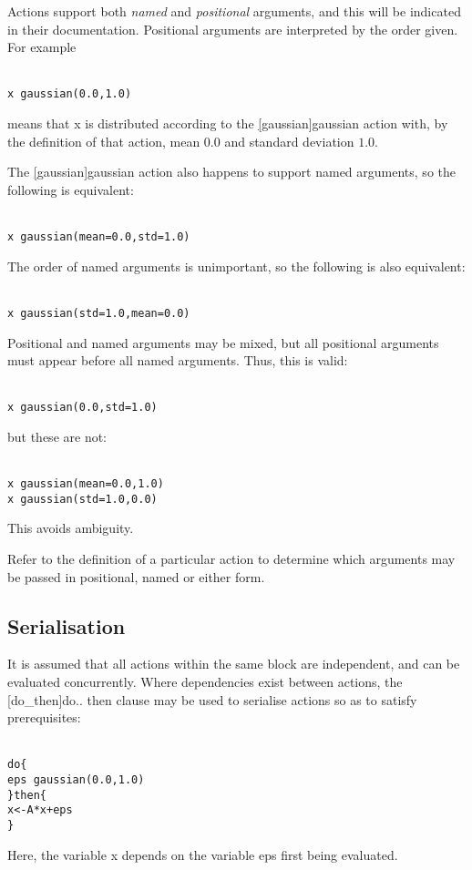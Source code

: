 Actions support both \emph{named} and \emph{positional}
arguments, and this will be indicated in their
documentation. Positional arguments are interpreted by the order given. For
example
\begin{alltt}{\sf
    x ~ gaussian(0.0, 1.0)
}\end{alltt}
means that \textsf{x} is distributed according to the
\hyperref[hyper][gaussian]{\sf gaussian} action with, by the
definition of that action, mean $0.0$ and standard deviation $1.0$.

The \hyperref[hyper][gaussian]{\sf gaussian} action also
happens to support named arguments, so the following is equivalent:
\begin{alltt}{\sf
    x ~ gaussian(mean = 0.0, std = 1.0)
}\end{alltt}
The order of named arguments is unimportant, so the following is also
equivalent:
\begin{alltt}{\sf
    x ~ gaussian(std = 1.0, mean = 0.0)
}\end{alltt}

Positional and named arguments may be mixed, but all positional arguments must
appear before all named arguments. Thus, this is valid:
\begin{alltt}{\sf
    x ~ gaussian(0.0, std = 1.0)
}\end{alltt}
but these are not:
\begin{alltt}{\sf
    x ~ gaussian(mean = 0.0, 1.0)
    x ~ gaussian(std = 1.0, 0.0)
}\end{alltt}
This avoids ambiguity.

Refer to the definition of a particular action to determine which arguments
may be passed in positional, named or either form.

\subsection{Serialisation\label{Serialisation}}

It is assumed that all actions within the same block are independent, and can
be evaluated concurrently. Where dependencies exist between actions, the
\hyperref[hyper][do_then]{\sf do.. then} clause may be used to
serialise actions so as to satisfy prerequisites:
\begin{alltt}{\sf
    do \{
      eps ~ gaussian(0.0, 1.0)
    \} then \{
      x <- A*x + eps
    \}
}\end{alltt}
Here, the variable \textsf{x} depends on the variable \textsf{eps} first being
evaluated.

